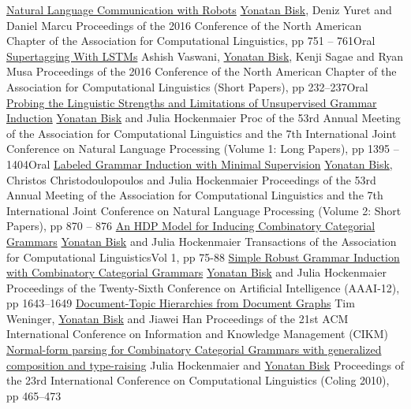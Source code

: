 \documentclass[10pt,letter]{moderncv}
\newcommand{\YB}{\underline{Yonatan Bisk}}
\begin{document}
\pub{--}
  {\href{http://yonatanbisk.com/papers/2016-NAACL.pdf}{Natural Language Communication with Robots}}
  {\YB{}, Deniz Yuret and Daniel Marcu}
  {Proceedings of the 2016 Conference of the North American Chapter of the Association for Computational Linguistics, pp 751 -- 761}{Oral}{}
\pub{--}
  {\href{http://yonatanbisk.com/papers/2016-NAACLShort.pdf}{Supertagging With LSTMs}}
  {Ashish Vaswani, \YB, Kenji Sagae and Ryan Musa}
  {Proceedings of the 2016 Conference of the North American Chapter of the Association for Computational Linguistics (Short Papers), pp 232--237}{Oral}{}
  {\href{http://yonatanbisk.com/papers/2015-ACL.pdf}{Probing the Linguistic Strengths and Limitations of Unsupervised Grammar Induction}}
  {\YB{} and Julia Hockenmaier}
  {Proc of the 53rd Annual Meeting of the Association for Computational Linguistics and the 7th International Joint Conference on Natural Language Processing (Volume 1: Long Papers), pp 1395 -- 1404}{Oral}{}
\pub{--}
  {\href{http://yonatanbisk.com/papers/2015-ACLShort-Fixed.pdf}{Labeled Grammar Induction with Minimal Supervision}}
  {\YB, Christos Christodoulopoulos and Julia Hockenmaier}
  {Proceedings of the 53rd Annual Meeting of the Association for Computational Linguistics and the 7th International Joint Conference on Natural Language Processing (Volume 2: Short Papers), pp 870 -- 876 }{}{}
  {\href{http://yonatanbisk.com/papers/2013-TACL.pdf}{An HDP Model for Inducing Combinatory Categorial Grammars}}
  {\YB{} and Julia Hockenmaier}
  {Transactions of the Association for Computational Linguistics}{Vol 1, pp 75-88}{}
  {\href{http://yonatanbisk.com/papers/2012-AAAI.pdf}{Simple Robust Grammar Induction with Combinatory Categorial Grammars}}
  {\YB{} and Julia Hockenmaier}
  {Proceedings of the Twenty-Sixth Conference on Artificial Intelligence (AAAI-12), pp 1643--1649}{}{}
\pub{--}
  {\href{http://yonatanbisk.com/papers/2012-CIKM.pdf}{Document-Topic Hierarchies from Document Graphs}}
  {Tim Weninger, \YB{} and Jiawei Han}
  {Proceedings of the 21st ACM International Conference on Information and Knowledge Management (CIKM)}{}{}
  {\href{http://yonatanbisk.com/papers/2010-COLING.pdf}{Normal-form parsing for Combinatory Categorial Grammars with generalized composition and type-raising}}
  {Julia Hockenmaier and \YB{}}
  {Proceedings of the 23rd International Conference on Computational Linguistics (Coling 2010), pp 465--473}{}{}

\vspace{20pt}
\end{document}
